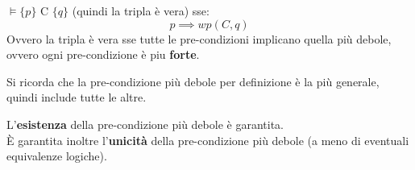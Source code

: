				      				\begin{definizione}
				      					  $\vDash\{p\}\mbox{ C }\{q\}$ (quindi la tripla è vera) sse:
				      					\[p\implies wp(C, q)\]
				      					Ovvero la tripla è vera sse tutte le pre-condizioni implicano quella più debole, ovvero ogni pre-condizione è piu \textbf{forte}.
				      					\begin{nota}
				      					Si ricorda che la pre-condizione più debole per definizione è la più generale, quindi include tutte le altre.
				      					\end{nota}
				      				\end{definizione}
				      				\begin{definizione}
				      					L'\textbf{esistenza} della pre-condizione più debole è garantita.\\
				      					È garantita inoltre l'\textbf{unicità} della pre-condizione più debole (a meno
				      					di eventuali equivalenze logiche).
				      				\end{definizione}
